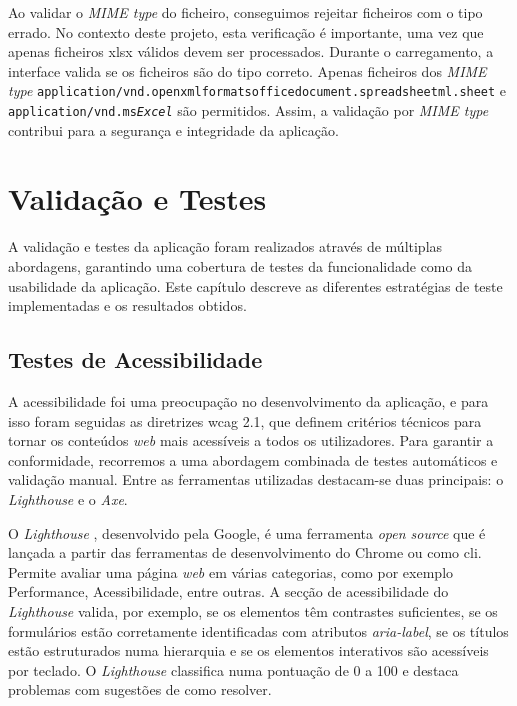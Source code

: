 Ao validar o \textit{MIME type} do ficheiro, conseguimos rejeitar ficheiros com o tipo errado. No contexto deste projeto, esta verificação é importante, uma vez que apenas ficheiros \gls{xlsx} válidos devem ser processados. Durante o carregamento, a interface valida se os ficheiros são do tipo correto. Apenas ficheiros dos \textit{MIME type}  \texttt{application/vnd\allowbreak.openxmlformats\allowbreak officedocument\allowbreak.spreadsheetml\allowbreak.sheet} e \texttt{application/vnd.ms\allowbreak \textit{Excel}} são permitidos.  Assim, a validação por \textit{MIME type} contribui para a segurança e integridade da aplicação.


\chapter{Validação e Testes}
\label{ch:validacaoTestes}

A validação e testes da aplicação foram realizados através de múltiplas abordagens, garantindo uma cobertura de testes  da funcionalidade como da usabilidade da aplicação. Este capítulo descreve as diferentes estratégias de teste implementadas e os resultados obtidos.

\section{Testes de Acessibilidade}

A acessibilidade foi uma preocupação no desenvolvimento da aplicação, e para isso foram seguidas as diretrizes \gls{wcag} 2.1\cite{wcag21}, que definem critérios técnicos para tornar os conteúdos  \textit{web} mais acessíveis a todos os utilizadores. Para garantir a conformidade, recorremos a uma abordagem combinada de testes automáticos e validação manual. Entre as ferramentas utilizadas destacam-se duas principais: o \textit{Lighthouse} e o \textit{Axe}.

O \textit{Lighthouse} \cite{lighthouse}, desenvolvido pela Google, é uma ferramenta \textit{open source} que é lançada a partir das ferramentas de desenvolvimento do Chrome ou como \gls{cli}. Permite avaliar uma página \textit{web} em várias categorias, como por exemplo Performance, Acessibilidade, entre outras. A secção de acessibilidade do \textit{Lighthouse} valida, por exemplo, se os elementos têm contrastes suficientes, se os formulários estão corretamente identificadas com atributos \textit{aria-label}, se os títulos estão estruturados numa hierarquia e se os elementos interativos são acessíveis por teclado. O \textit{Lighthouse} classifica numa pontuação de 0 a 100 e destaca problemas com sugestões de como resolver.

